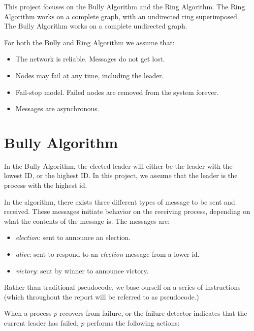 \documentclass{report}
\begin{document}

This project focuses on the Bully Algorithm and the Ring Algorithm. The Ring Algorithm works on a complete graph, with an undirected ring superimposed. The Bully Algorithm works on a complete undirected graph.

For both the Bully and Ring Algorithm we assume that:
\begin{itemize}
  \item The network is reliable. Messages do not get lost.
  \item Nodes may fail at any time, including the leader.
  \item Fail-stop model. Failed nodes are removed from the system forever.
  \item Messages are asynchronous.
\end{itemize}


\section{Bully Algorithm}

In the Bully Algorithm, the elected leader will either be the leader with the lowest ID, or the highest ID. In this project, we assume that the leader is the process with the highest id.

In the algorithm, there exists three different types of message to be sent and received. These messages initiate behavior on the receiving process, depending on what the contents of the message is. The messages are:
\begin{itemize}
  \item \textit{election}: sent to announce an election.
  \item \textit{alive}: sent to respond to an \textit{election} message from a lower id.
  \item \textit{victory}: sent by winner to announce victory.
\end{itemize}

Rather than traditional pseudocode, we base ourself on a series of instructions (which throughout the report will be referred to as pseudocode.)

When a process $p$ recovers from failure, or the failure detector indicates that the current leader has failed, $p$ performs the following actions:
\end{document}
